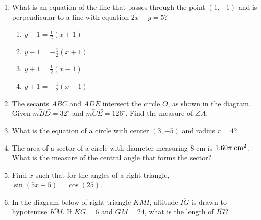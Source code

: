 \documentclass[12pt, oneside]{article}
\begin{document}
\begin{enumerate}[itemsep=1.2cm]
\item What is an equation of the line that passes through the point $(1,-1)$ and is perpendicular to a line with equation $2x-y=5$?
\begin{multicols}{2}
\begin{enumerate}
    \item $y-1=\frac{1}{2}(x+1)$
    \item $y-1=-\frac{1}{2}(x+1)$ 
    \item $y+1=\frac{1}{2}(x-1)$
    \item $y+1=-\frac{1}{2}(x-1)$
\end{enumerate}
\end{multicols}

\item The secants $\overline{ABC}$ and $\overline{ADE}$ intersect the circle $O$, as shown in the diagram. \\Given $m \wideparen{BD}=32^\circ$ and $m \wideparen{CE}=126^\circ$. Find the measure of $\angle A$.
  \begin{center}
  \end{center}

\newpage
\item What is the equation of a circle with center $(3,-5)$ and radius $r=4$?

\item The area of a sector of a circle with diameter measuring 8 cm is $1.60\pi \; \rm{cm}^2$. What is the measure of the central angle that forms the sector?

\item Find $x$ such that for the angles of a right triangle, $\sin (5x + 5)=\cos (25)$.

\item In the diagram below of right triangle $KMI$, altitude $\overline{IG}$ is drawn to hypotenuse $\overline{KM}$. If $KG=6$ and $GM=24$, what is the length of $\overline{IG}$?
\begin{center}
\end{center}



\end{enumerate}
\end{document}

